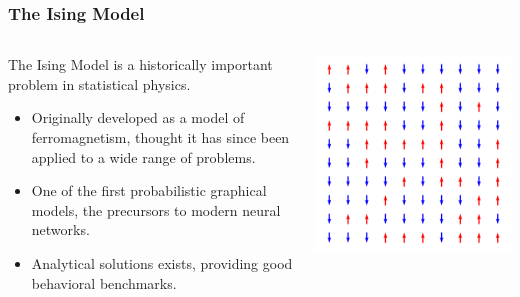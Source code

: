 \documentclass[aspectratio=169, 12pt]{beamer}
\begin{document}
\begin{frame}
    \frametitle{The Ising Model}

    \begin{columns}
        \begin{column}{.6\textwidth}
            
            The Ising Model is a historically important problem in statistical physics. 

            \begin{itemize}
                \item Originally developed as a model of ferromagnetism, thought it has since been applied to a wide range of problems. 
                \item One of the first probabilistic graphical models, the precursors to modern neural networks. 
                \item Analytical solutions exists, providing good behavioral benchmarks. 
            \end{itemize}
            
        \end{column}
        \begin{column}{.4\textwidth}
            \includegraphics[width=\textwidth]{images/ising-spins.png}
        \end{column}
    \end{columns}
\end{frame}
\end{document}
